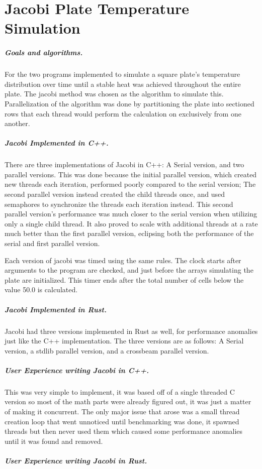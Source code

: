 \chapter{Jacobi Plate Temperature Simulation}
\paragraph{Goals and algorithms.}
For the two programs implemented to simulate a square plate's temperature
distribution over time until a stable heat was achieved throughout the
entire plate. The jacobi method was chosen as the algorithm to simulate this.
Parallelization of the algorithm was done by partitioning the plate into
sectioned rows that each thread would perform the calculation on exclusively
from one another.

\paragraph{Jacobi Implemented in C++.}
There are three implementations of Jacobi in C++: A Serial version, and two
parallel versions. This was done because the initial parallel version, which
created new threads each iteration, performed poorly compared to the serial
version; The second parallel version instead created the child threads once,
and used semaphores to synchronize the threads each iteration instead. This
second parallel version's performance was much closer to the serial version
when utilizing only a single child thread. It also proved to scale with
additional threads at a rate much better than the first parallel version,
eclipsing both the performance of the serial and first parallel version.

\par Each version of jacobi was timed using the same rules. The clock starts
after arguments to the program are checked, and just before the arrays
simulating the plate are initialized. This timer ends after the total number
of cells below the value 50.0 is calculated.

\paragraph{Jacobi Implemented in Rust.}
Jacobi had three versions implemented in Rust as well, for performance anomalies
just like the C++ implementation. The three versions are as follows: A Serial
version, a stdlib parallel version, and a crossbeam parallel version.

\paragraph{User Experience writing Jacobi in C++.}
This was very simple to implement, it was based off of a single threaded C
version so most of the math parts were already figured out, it was just a
matter of making it concurrent. The only major issue that arose was a small
thread creation loop that went unnoticed until benchmarking was done, it
spawned threads but then never used them which caused some performance
anomalies until it was found and removed.

\paragraph{User Experience writing Jacobi in Rust.}

